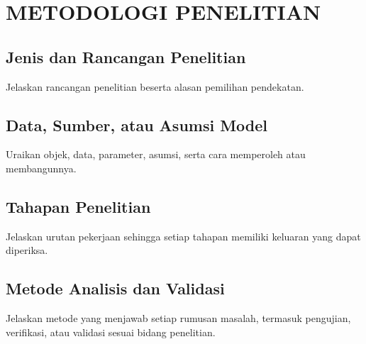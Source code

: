 \chapter{METODOLOGI PENELITIAN}
\section{Jenis dan Rancangan Penelitian}
Jelaskan rancangan penelitian beserta alasan pemilihan pendekatan.
\section{Data, Sumber, atau Asumsi Model}
Uraikan objek, data, parameter, asumsi, serta cara memperoleh atau membangunnya.
\section{Tahapan Penelitian}
Jelaskan urutan pekerjaan sehingga setiap tahapan memiliki keluaran yang dapat diperiksa.
\section{Metode Analisis dan Validasi}
Jelaskan metode yang menjawab setiap rumusan masalah, termasuk pengujian, verifikasi, atau validasi sesuai bidang penelitian.
